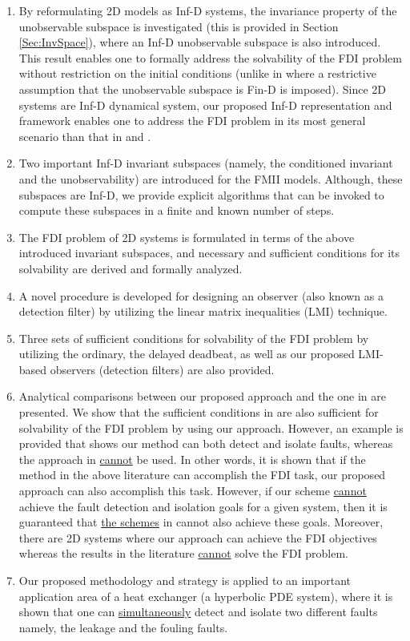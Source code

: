 \documentclass[journal,12pt,draftcls,onecolumn]{IEEEtran}
\begin{document}
\begin{enumerate}
	\item By reformulating  2D models as  Inf-D systems, the invariance property of the unobservable subspace is investigated (this is provided in Section \ref{Sec:InvSpace}), where an Inf-D unobservable subspace is also introduced. This result enables one to formally address the  solvability of the FDI problem without restriction on the initial conditions (unlike in \cite{ACC2013, ACC2014} where a restrictive assumption that the unobservable subspace is Fin-D  is imposed). Since 2D systems are Inf-D dynamical system, our proposed Inf-D representation and framework enables one to address the FDI problem in its most general scenario than that in \cite{ACC2013} and \cite{ACC2014}.
	\item Two important Inf-D invariant subspaces (namely, the conditioned invariant and the unobservability) are introduced for the FMII models. Although, these subspaces are Inf-D, we provide explicit algorithms that can be invoked to compute these subspaces in a finite and known number of steps.
	\item The FDI problem of 2D systems is formulated in terms  of the above introduced invariant subspaces, and necessary and sufficient conditions for its solvability are derived and formally analyzed.
	\item A novel procedure is developed for designing an observer (also known as a detection filter)  by utilizing the linear matrix inequalities (LMI) technique.
	\item Three sets of sufficient conditions for solvability of the FDI problem by utilizing the ordinary, the delayed deadbeat, as well as our proposed LMI-based observers (detection filters) are also provided.
	\item Analytical comparisons between our proposed approach and the one in \cite{Malek_3DFDI} are presented. We show that the sufficient conditions in\cite{Malek_3DFDI} are also sufficient for solvability of the FDI problem by using our  approach. However, an example is provided that shows our method can both detect and isolate faults, whereas the approach in  \cite{Malek_3DFDI}  \underline{cannot} be used. In other words, it is shown that if the method in the above literature can accomplish the FDI task, our proposed approach can also accomplish this task. However, if our scheme \underline{cannot} achieve the fault detection and isolation goals for a given system, then it is guaranteed that \underline{the schemes} in \cite{Malek_3DFDI} cannot also achieve these goals. Moreover, there are 2D systems  where our approach can achieve the FDI objectives whereas the results in the  literature \underline{cannot} solve the FDI problem.
\item Our proposed methodology and strategy is applied to an important application area of a heat exchanger (a hyperbolic PDE system), where it is shown that one can \underline{simultaneously} detect and isolate two different faults namely, the leakage and the fouling faults.
\end{enumerate}
\end{document}
